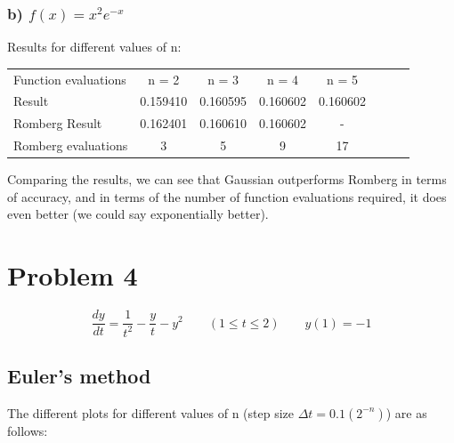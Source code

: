 \documentclass[12pt,letterpaper]{article}
\begin{document}
\subsubsection*{b) $f(x) = x^2e^{-x}$}

Results for different values of n:

\begin{center}
\begin{tabular}{l*{6}{c}r}
\hline
Function evaluations	   	& n = 2 		& n = 3 	& n = 4 	& n = 5\\
Result	 		& 0.159410 	& 0.160595	 	& 0.160602 		& 0.160602\\
\hline
Romberg Result	& 0.162401	& 0.160610		& 0.160602		&	-		\\
Romberg evaluations 		&	3			&	5		&	9		& 17 \\
\hline
\end{tabular}
\end{center}

Comparing the results, we can see that Gaussian outperforms Romberg in terms of accuracy, and in terms of the number of function evaluations required, it does even better (we could say exponentially better).

\newpage

\section*{Problem 4}
\begin{equation*}
\dfrac{dy}{dt} = \dfrac{1}{t^2} - \dfrac{y}{t} - y^2 \qquad (1 \leq t \leq 2) \qquad y(1) = -1
\end{equation*}

\subsection*{Euler's method}

The different plots for different values of n (step size $\Delta t = 0.1(2^{-n})$) are as follows:
\end{document}
